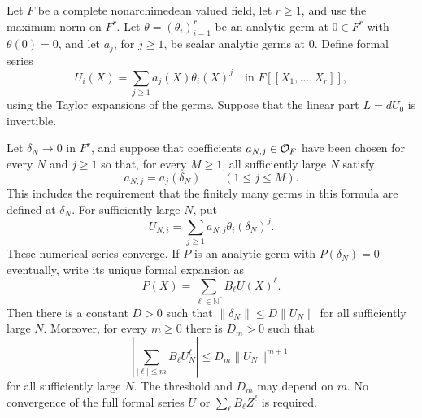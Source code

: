 \begin{lemma}\label{orb:finite-jets}
Let $F$ be a complete nonarchimedean valued field, let $r\geq1$, and use
the maximum norm on $F^r$.  Let $\theta=(\theta_i)_{i=1}^r$ be an analytic germ at
$0\in F^r$ with $\theta(0)=0$, and let $a_j$, for $j\geq1$, be scalar
analytic germs at $0$.  Define formal series
\[
 U_i(X)=\sum_{j\geq1}a_j(X)\theta_i(X)^j
 \quad\text{in }F[[X_1,\ldots,X_r]],
\]
using the Taylor expansions of the germs.  Suppose that the linear part
$L=dU_0$ is invertible.

Let $\delta_N\to0$ in $F^r$, and suppose that coefficients
$a_{N,j}\in\mathcal O_F$ have been chosen for every $N$ and $j\geq1$ so that,
for every $M\geq1$, all sufficiently large $N$ satisfy
\[
 a_{N,j}=a_j(\delta_N)\qquad(1\leq j\leq M).
\]
This includes the requirement that the finitely many germs in this
formula are defined at $\delta_N$.  For sufficiently large $N$, put
\[
 U_{N,i}=\sum_{j\geq1}a_{N,j}\theta_i(\delta_N)^j.
\]
These numerical series converge.  If $P$ is an analytic germ with
$P(\delta_N)=0$ eventually, write its unique formal expansion as
\[
 P(X)=\sum_{\ell\in\mathbb N^r}B_\ell U(X)^\ell.
\]
Then there is a constant $D>0$ such that
$\|\delta_N\|\leq D\|U_N\|$ for all sufficiently large $N$.
Moreover, for every $m\geq0$ there is $D_m>0$ such that
\begin{equation}\label{orb:finite-jet-estimate}
 \left|\sum_{|\ell|\leq m}B_\ell U_N^\ell\right|
 \leq D_m\|U_N\|^{m+1}
\end{equation}
for all sufficiently large $N$.  The threshold and $D_m$ may depend on
$m$.  No convergence of the full formal series $U$ or
$\sum_\ell B_\ell Z^\ell$ is required.
\end{lemma}

